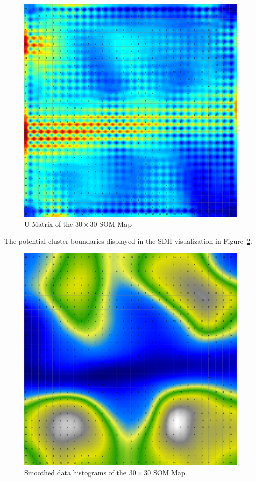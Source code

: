 \documentclass{acm_proc_article-sp}
\begin{document}
\begin{figure}
\centering
\includegraphics[width=\linewidth]{img/wine-big-u-matrix}
\caption{U Matrix of the $30\times30$ SOM Map}
\label{fig:wine-big-u-matrix}
\end{figure}

The potential cluster boundaries displayed in the SDH visualization in Figure~\ref{fig:wine-big-smoothed-data-histogram}.

\begin{figure}
\centering
\includegraphics[width=\linewidth]{img/wine-big-smoothed-data-histogram}
\caption{Smoothed data histograms of the $30\times30$ SOM Map}
\label{fig:wine-big-smoothed-data-histogram}
\end{figure}
\end{document}
